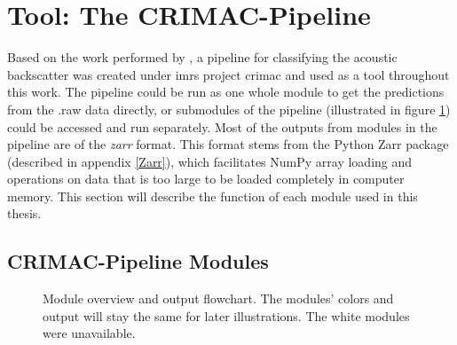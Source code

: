     \section{Tool: The CRIMAC-Pipeline}
        Based on the work performed by \citeauthor{brautaset2020acoustic}\cite{brautaset2020acoustic}, a pipeline for classifying the acoustic backscatter was created under \gls{imr}s project \gls{crimac}\cite{crimac_pipeline} and used as a tool throughout this work. The pipeline could be run as one whole module to get the predictions from the .raw data directly, or submodules of the pipeline (illustrated in figure \ref{Module_overview_fig}) could be accessed and run separately. Most of the outputs from modules in the pipeline are of the \textit{zarr} format. This format stems from the Python Zarr package (described in appendix \ref{Zarr}), which facilitates NumPy array loading and operations on data that is too large to be loaded completely in computer memory. This section will describe the function of each module used in this thesis.
        
            \subsection{CRIMAC-Pipeline Modules} \label{CRIMAC-pipeline}
              \begin{figure}[H]
                \centering
                
                \caption[Module overview]{Module overview and output flowchart. The modules' colors and output will stay the same for later illustrations. The white modules were unavailable.}
              	\medskip 
                \label{Module_overview_fig}
            \end{figure}

